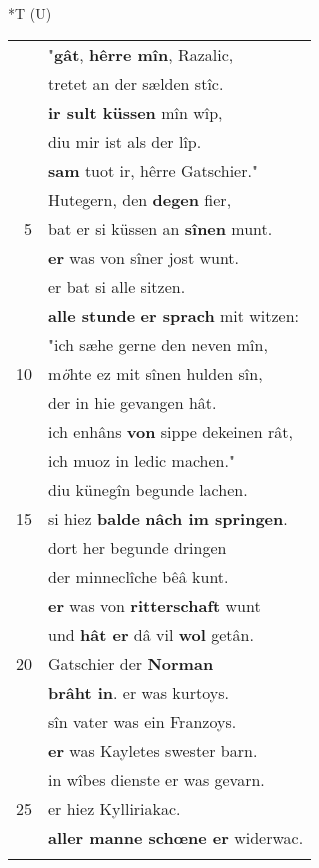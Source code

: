 \documentclass[8pt,a4paper,notitlepage]{article}
\begin{document}
\begin{table}[ht]
\hspace{0.5cm}
\begin{minipage}[t]{0.5\linewidth}
\small
\begin{center}*T (U)
\end{center}
\begin{tabular}{rl}
 & "\textbf{gât}, \textbf{hêrre mîn}, Razalic,\\ 
 & tretet an der sælden stîc.\\ 
 & \textbf{ir sult küssen} mîn wîp,\\ 
 & diu mir ist als der lîp.\\ 
 & \textbf{sam} tuot ir, hêrre Gatschier."\\ 
 & Hutegern, den \textbf{degen} fier,\\ 
5 & bat er si küssen an \textbf{sînen} munt.\\ 
 & \textbf{er} was von sîner jost wunt.\\ 
 & er bat si alle sitzen.\\ 
 & \textbf{alle stunde} \textbf{er sprach} mit witzen:\\ 
 & "ich sæhe gerne den neven mîn,\\ 
10 & m\textit{ö}hte ez mit sînen hulden sîn,\\ 
 & der in hie gevangen hât.\\ 
 & ich enhâns \textbf{von} sippe dekeinen rât,\\ 
 & ich muoz in ledic machen."\\ 
 & diu künegîn begunde lachen.\\ 
15 & si hiez \textbf{balde} \textbf{nâch im springen}.\\ 
 & dort her begunde dringen\\ 
 & der minneclîche bêâ kunt.\\ 
 & \textbf{er} was von \textbf{ritterschaft} wunt\\ 
 & und \textbf{hât er} dâ vil \textbf{wol} getân.\\ 
20 & Gatschier der \textbf{Norman}\\ 
 & \textbf{brâht in}. er was kurtoys.\\ 
 & sîn vater was ein Franzoys.\\ 
 & \textbf{er} was Kayletes swester barn.\\ 
 & in wîbes dienste er was gevarn.\\ 
25 & er hiez Kylliriakac.\\ 
 & \textbf{aller manne schœne er} widerwac.\\ 
 & \textbf{\begin{large}D\end{large}ô} in Gahmuret \textbf{ersach},\\ 

\end{tabular}
\end{minipage}
\end{table}
\end{document}
